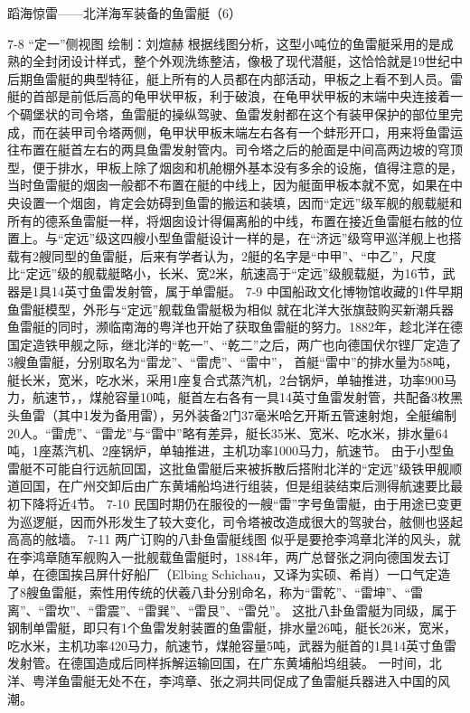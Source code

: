 \documentclass[12pt,UTF8]{ctexbook}
\begin{document}
蹈海惊雷——北洋海军装备的鱼雷艇（6）

7-8 “定一”侧视图 绘制：刘煊赫
根据线图分析，这型小吨位的鱼雷艇采用的是成熟的全封闭设计样式，整个外观洗练整洁，像极了现代潜艇，这恰恰就是19世纪中后期鱼雷艇的典型特征，艇上所有的人员都在内部活动，甲板之上看不到人员。雷艇的首部是前低后高的龟甲状甲板，利于破浪，在龟甲状甲板的末端中央连接着一个碉堡状的司令塔，鱼雷艇的操纵驾驶、鱼雷发射都在这个有装甲保护的部位里完成，而在装甲司令塔两侧，龟甲状甲板末端左右各有一个蚌形开口，用来将鱼雷运往布置在艇首左右的两具鱼雷发射管内。司令塔之后的舱面是中间高两边坡的穹顶型，便于排水，甲板上除了烟囱和机舱棚外基本没有多余的设施，值得注意的是，当时鱼雷艇的烟囱一般都不布置在艇的中线上，因为艇面甲板本就不宽，如果在中央设置一个烟囱，肯定会妨碍到鱼雷的搬运和装填，因而“定远”级军舰的舰载艇和所有的德系鱼雷艇一样，将烟囱设计得偏离船的中线，布置在接近鱼雷艇右舷的位置上。与“定远”级这四艘小型鱼雷艇设计一样的是，在“济远”级穹甲巡洋舰上也搭载有2艘同型的鱼雷艇，后来有学者认为，2艇的名字是“中甲”、“中乙”，尺度比“定远”级的舰载艇略小，长米、宽2米，航速高于“定远”级舰载艇，为16节，武器是1具14英寸鱼雷发射管，属于单雷艇。
7-9
中国船政文化博物馆收藏的1件早期鱼雷艇模型，外形与“定远”舰载鱼雷艇极为相似
就在北洋大张旗鼓购买新潮兵器鱼雷艇的同时，濒临南海的粤洋也开始了获取鱼雷艇的努力。1882年，趁北洋在德国定造铁甲舰之际，继北洋的“乾一”、“乾二”之后，两广也向德国伏尔铿厂定造了3艘鱼雷艇，分别取名为“雷龙”、“雷虎”、“雷中”， 首艇“雷中”的排水量为58吨，艇长米，宽米，吃水米，采用1座复合式蒸汽机，2台锅炉，单轴推进，功率900马力，航速节，，煤舱容量10吨，艇首左右各有一具14英寸鱼雷发射管，共配备3枚黑头鱼雷（其中1发为备用雷），另外装备2门37毫米哈乞开斯五管速射炮，全艇编制20人。“雷虎”、“雷龙”与“雷中”略有差异，艇长35米、宽米、吃水米，排水量64吨，1座蒸汽机、2座锅炉，单轴推进，主机功率1000马力，航速节。 由于小型鱼雷艇不可能自行远航回国，这批鱼雷艇后来被拆散后搭附北洋的“定远”级铁甲舰顺道回国，在广州交卸后由广东黄埔船坞进行组装，但是组装结束后测得航速要比最初下降将近4节。
7-10
民国时期仍在服役的一艘“雷”字号鱼雷艇，由于用途已变更为巡逻艇，因而外形发生了较大变化，司令塔被改造成很大的驾驶台，舷侧也竖起高高的舷墙。
7-11 两广订购的八卦鱼雷艇线图
似乎是要抢李鸿章北洋的风头，就在李鸿章随军舰购入一批舰载鱼雷艇时，1884年，两广总督张之洞向德国发去订单，在德国挨吕屏什好船厂（Elbing Schichau，又译为实硕、希肖）一口气定造了8艘鱼雷艇，索性用传统的伏羲八卦分别命名，称为“雷乾”、“雷坤”、“雷离”、“雷坎”、“雷震”、“雷巽”、“雷艮”、“雷兑”。 这批八卦鱼雷艇为同级，属于钢制单雷艇，即只有1个鱼雷发射装置的鱼雷艇，排水量26吨，艇长26米，宽米，吃水米，主机功率420马力，航速节，煤舱容量5吨，武器为艇首的1具14英寸鱼雷发射管。在德国造成后同样拆解运输回国，在广东黄埔船坞组装。 一时间，北洋、粤洋鱼雷艇无处不在，李鸿章、张之洞共同促成了鱼雷艇兵器进入中国的风潮。
\end{document}
